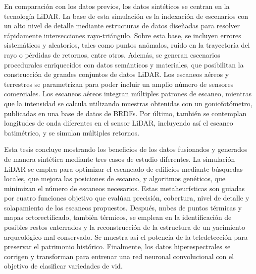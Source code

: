 En comparación con los datos previos, los datos sintéticos se centran en la tecnología LiDAR. La base de esta simulación es la indexación de escenarios con un alto nivel de detalle mediante estructuras de datos diseñadas para resolver rápidamente intersecciones rayo-triángulo. Sobre esta base, se incluyen errores sistemáticos y aleatorios, tales como puntos anómalos, ruido en la trayectoría del rayo o pérdidas de retornos, entre otros. Además, se generan escenarios procedurales enriquecidos con datos semánticos y materiales, que posibilitan la construcción de grandes conjuntos de datos LiDAR. Los escaneos aéreos y terrestres se parametrizan para poder incluir un amplio número de sensores comerciales. Los escaneos aéreos integran múltiples patrones de escaneo, mientras que la intensidad se calcula utilizando muestras obtenidas con un goniofotómetro, publicadas en una base de datos de BRDFs. Por último, también se contemplan longitudes de onda diferentes en el sensor LiDAR, incluyendo así el escaneo batimétrico, y se simulan múltiples retornos.

Esta tesis concluye mostrando los beneficios de los datos fusionados y generados de manera sintética mediante tres casos de estudio diferentes. La simulación LiDAR se emplea para optimizar el escaneado de edificios mediante búsquedas locales, que mejora las posiciones de escaneo, y algoritmos genéticos, que minimizan el número de escaneos necesarios. Estas metaheurísticas son guiadas por cuatro funciones objetivo que evalúan precisión, cobertura, nivel de detalle y solapamiento de los escaneos propuestos. Después, nubes de puntos térmicas y mapas ortorectificado, también térmicos, se emplean en la identificación de posibles restos enterrados y la reconstrucción de la estructura de un yacimiento arqueológico mal conservado. Se muestra así el potencia de la teledetección para preservar el patrimonio histórico. Finalmente, los datos hiperespectrales se corrigen y transforman para entrenar una red neuronal convolucional con el objetivo de clasificar variedades de vid.
